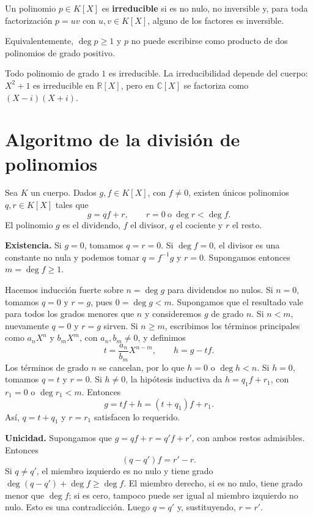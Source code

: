 \begin{definicion}[{title={Polinomio irreducible}}]
Un polinomio $p\in K[X]$ es \textbf{irreducible} si es no nulo, no
inversible y, para toda factorización $p=uv$ con $u,v\in K[X]$, alguno
de los factores es inversible.
\end{definicion}
Equivalentemente, $\deg p\geq1$ y $p$ no puede escribirse como producto
de dos polinomios de grado positivo.
\begin{ejemplo}
Todo polinomio de grado $1$ es irreducible. La irreducibilidad depende
del cuerpo: $X^2+1$ es irreducible en $\mathbb R[X]$, pero en
$\mathbb C[X]$ se factoriza como $(X-i)(X+i)$.
\end{ejemplo}

\section{Algoritmo de la división de polinomios}
\begin{proposicion}[{title={Algoritmo de la división}}]
Sea $K$ un cuerpo. Dados $g,f\in K[X]$, con $f\neq0$, existen únicos
polinomios $q,r\in K[X]$ tales que
\[
g=qf+r,\qquad r=0\ \text{o}\ \deg r<\deg f.
\]
El polinomio $g$ es el dividendo, $f$ el divisor, $q$ el cociente y
$r$ el resto.
\end{proposicion}
\begin{demostracion}
\textbf{Existencia.} Si $g=0$, tomamos $q=r=0$.
Si $\deg f=0$, el divisor es una constante no nula y podemos tomar
$q=f^{-1}g$ y $r=0$. Supongamos entonces $m=\deg f\geq1$.

Hacemos inducción fuerte sobre $n=\deg g$ para dividendos no nulos.
Si $n=0$, tomamos $q=0$ y $r=g$, pues $0=\deg g<m$.
Supongamos que el resultado vale para todos los grados menores que
$n$ y consideremos $g$ de grado $n$. Si $n<m$, nuevamente $q=0$ y
$r=g$ sirven. Si $n\geq m$, escribimos los términos principales como
$a_nX^n$ y $b_mX^m$, con $a_n,b_m\neq0$, y definimos
\[
t=\frac{a_n}{b_m}X^{n-m},\qquad h=g-tf.
\]
Los términos de grado $n$ se cancelan, por lo que $h=0$ o
$\deg h<n$. Si $h=0$, tomamos $q=t$ y $r=0$.
Si $h\neq0$, la hipótesis inductiva da $h=q_1f+r_1$, con
$r_1=0$ o $\deg r_1<m$. Entonces
\[
g=tf+h=(t+q_1)f+r_1.
\]
Así, $q=t+q_1$ y $r=r_1$ satisfacen lo requerido.

\textbf{Unicidad.} Supongamos que
$g=qf+r=q'f+r'$, con ambos restos admisibles. Entonces
\[
(q-q')f=r'-r.
\]
Si $q\neq q'$, el miembro izquierdo es no nulo y tiene grado
$\deg(q-q')+\deg f\geq\deg f$. El miembro derecho, si es no nulo,
tiene grado menor que $\deg f$; si es cero, tampoco puede ser igual
al miembro izquierdo no nulo. Esto es una contradicción.
Luego $q=q'$ y, sustituyendo, $r=r'$.
\end{demostracion}
